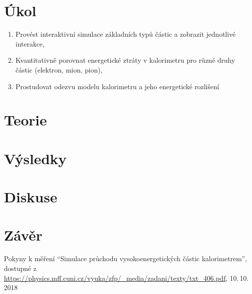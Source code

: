 \documentclass{protokol}
\begin{document}
  \section*{Úkol}

    \begin{enumerate}
      \item Provést interaktivní simulace základních typů částic a zobrazit jednotlivé interakce,
      \item Kvantitativně porovnat energetické ztráty v kalorimetru pro různé druhy částic (elektron, mion, pion),
      \item Prostudovat odezvu modelu kalorimetru a jeho energetické rozlišení
    \end{enumerate}

  \section*{Teorie}

    
  \section*{Výsledky}


  \section*{Diskuse}


  \section*{Závěr}


  \begin{thebibliography}{}
 
    Pokyny k měření ``Simulace průchodu vysokoenergetických částic
    kalorimetrem'', dostupné z\\ \url{https://physics.mff.cuni.cz/vyuka/zfp/_media/zadani/texty/txt_406.pdf}, 10.\,10.\,2018
   
  \end{thebibliography}
\end{document}
